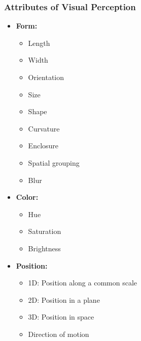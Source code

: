 \documentclass[11pt,fleqn]{book} %
\begin{document}
\subsubsection{Attributes of Visual Perception}
\begin{multicols}{2}
\begin{itemize}
  \item \textbf{Form:}
    \begin{itemize}
      \item Length
      \item Width
      \item Orientation
      \item Size
      \item Shape
      \item Curvature
      \item Enclosure
      \item Spatial grouping
      \item Blur
    \end{itemize}
  \item \textbf{Color:}
    \begin{itemize}
      \item Hue
      \item Saturation
      \item Brightness
    \end{itemize}
  \item \textbf{Position:}
    \begin{itemize}
      \item 1D: Position along a common scale
      \item 2D: Position in a plane
      \item 3D: Position in space
      \item Direction of motion
    \end{itemize}
\end{itemize}
\end{multicols}
\end{document}
